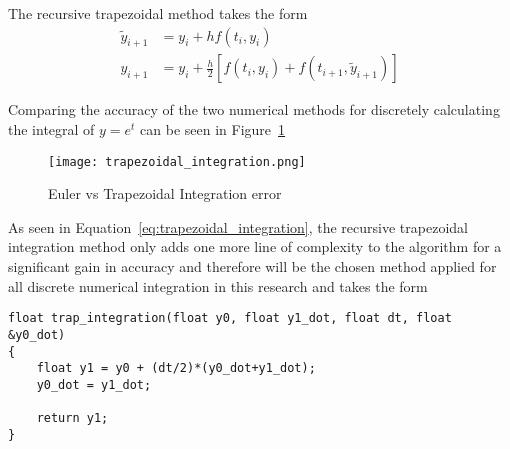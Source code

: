 The recursive trapezoidal method takes the form
\begin{equation}\label{eq:trapezoidal_integration}
\begin{split}
\tilde{y}_{i+1}&=y_i+hf(t_i,y_i) \\
y_{i+1}&=y_i+\frac{h}{2}[f(t_i,y_i)+f(t_{i+1},\tilde{y}_{i+1})]
\end{split}
\end{equation}

Comparing the accuracy of the two numerical methods for discretely calculating the integral of $y=e^t$ can be seen in Figure~\ref{fig:trapezoidal_integration}

\begin{figure}[h!]
 \centering
  \texttt{[image: trapezoidal\_integration.png]}
  \caption{Euler vs Trapezoidal Integration error}
  \label{fig:trapezoidal_integration}
\end{figure}

As seen in Equation~\ref{eq:trapezoidal_integration}, the recursive trapezoidal integration method only adds one more line of complexity to the algorithm for a significant gain in accuracy and therefore will be the chosen method applied for all discrete numerical integration in this research and takes the form \newline

\begin{lstlisting}
float trap_integration(float y0, float y1_dot, float dt, float &y0_dot)
{
    float y1 = y0 + (dt/2)*(y0_dot+y1_dot);
    y0_dot = y1_dot;

    return y1;
}
\end{lstlisting}










